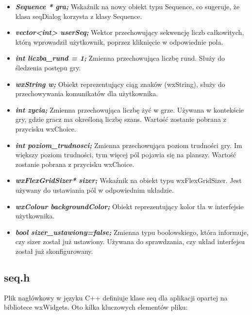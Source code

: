 \documentclass[]{report}
\begin{document}
\begin{itemize}
\begin{itemize}
			\item \textit{\textbf{Sequence * gra;}} Wskaźnik na nowy obiekt typu Sequence, co sugeruje, że klasa seqDialog korzysta z klasy Sequence.
			
			\item \textit{\textbf{vector<int> userSeq;}} Wektor przechowujący sekwencję liczb całkowitych, którą wprowadził użytkownik, poprzez kliknięcie w odpowiednie pola.
			
			\item \textit{\textbf{int liczba\_rund = 1;}} Zmienna przechowująca liczbę rund. Służy do śledzenia postępu gry.
			
			\item \textit{\textbf{wxString w;}} Obiekt reprezentujący ciąg znaków (wxString), służy do przechowywania komunikatów dla użytkownika.
			
			\item \textit{\textbf{int zycia;}} Zmienna przechowująca liczbę żyć w grze. Używana w kontekście gry, gdzie gracz ma określoną liczbę szans. Wartość zostanie pobrana z przycisku wxChoice.
			
			\item \textit{\textbf{int poziom\_trudnosci;}} Zmienna przechowująca poziom trudności gry. Im większy poziom trudności, tym więcej pól pojawia się na planszy. Wartość zostanie pobrana z przycisku wxChoice.
			
			\item \textit{\textbf{wxFlexGridSizer* sizer;}} Wskaźnik na obiekt typu wxFlexGridSizer. Jest używany do ustawiania pól w odpowiednim układzie.
			
			\item \textit{\textbf{wxColour backgroundColor;}} Obiekt reprezentujący kolor tła w interfejsie użytkownika.
			
			
			\item \textit{\textbf{bool sizer\_ustawiony=false;}} Zmienna typu boolowskiego, która informuje, czy sizer został już ustawiony. Używana do sprawdzania, czy układ interfejsu został już skonfigurowany.
		\end{itemize}
		
	\end{itemize}
	
	\newpage
	
	\subsection*{seq.h}
	Plik nagłówkowy w języku C++ definiuje klase seq dla aplikacji opartej na bibliotece wxWidgets. Oto kilka kluczowych elementów pliku:
	
\end{document}
